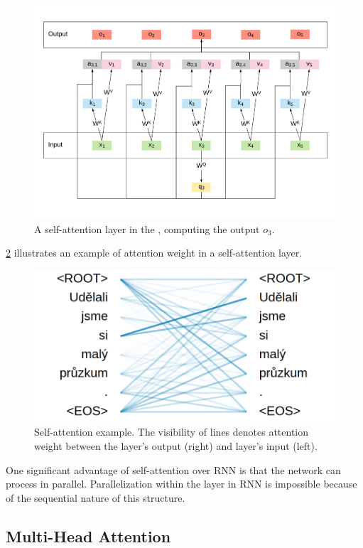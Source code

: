 \begin{figure}[t]
    \centering
    \includegraphics[width=\linewidth]{img/self-att.pdf}
    \caption{A self-attention layer in the \transformer, computing the output $o_3$.}
    \label{fig:self-att-layer}
\end{figure}

\cref{fig:self-att-sample} illustrates an example of attention weight in a self-attention layer.

\begin{figure}[t]
    \centering
    \includegraphics[width=0.6\linewidth]{img/self-att-sample.png}
    \caption{Self-attention example. The visibility of lines denotes attention weight between the layer's output (right) and layer's input (left).}
    \label{fig:self-att-sample}
\end{figure}

One significant advantage of self-attention over RNN is that the network can process in parallel. Parallelization within the layer in RNN is impossible because of the sequential nature of this structure.

\subsection{Multi-Head Attention}

